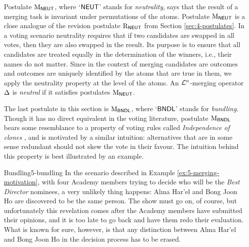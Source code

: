 Postulate $\mathrm{M}_{\mathsf{NEUT}}$, where `$\mathsf{NEUT}$' stands for \emph{neutrality},
says that the result of a merging task is invariant 
under permutations of the atoms.
Postulate $\mathrm{M}_{\mathsf{NEUT}}$ is a close analogue 
of the revision postulate $\mathrm{R}_{\mathsf{NEUT}}$ from Section \ref{sec:4-postulates}.
In a voting scenario neutrality requires that if two candidates are swapped in all votes, 
then they are also swapped in the result.
Its purpose is to ensure that all candidates are treated equally in the determination of the winners, 
i.e., their names do not matter.
Since in the context of merging candidates are outcomes
and outcomes are uniquely identified by the atoms that are true in them,
we apply the neutrality property at the level of the atoms.
An $\mathcal{L}^{n}$-merging operator $\Delta$ is \emph{neutral} if 
it satisfies postulates $\mathrm{M}_{\mathsf{NEUT}}$.


The last postulate in this section is $\mathrm{M}_{\mathsf{BNDL}}$, where `$\mathsf{BNDL}$'
stands for \emph{bundling}. 
Though it has no direct equivalent in the voting literature,
postulate $\mathrm{M}_{\mathsf{BNDL}}$ bears some resemblance to a property of voting rules 
called \emph{Independence of clones} \cite{BaumeisterR16},
and is motivated by a similar intuition:
alternatives that are in some sense redundant should not skew the vote in their favour.  
The intuition behind this property is best illustrated by an example.

\begin{xmpl}{Bundling}{5-bundling}
	In the scenario described in Example \ref{ex:5-merging-motivation},
	with four Academy members trying to decide who will be the \emph{Best Director} nominees,
	a very unlikely thing happens: Alma Har'el and Bong Joon Ho are discovered to be
	the same person.  
	The show must go on, of course, 
	but unfortunately this revelation comes after the Academy members have submitted their opinions,
	and it is too late to go back and have them redo their evaluation.
	What is known for sure, however, is that any distinction between Alma Har'el and Bong Joon Ho
	in the decision process has to be erased. 
\end{xmpl}

